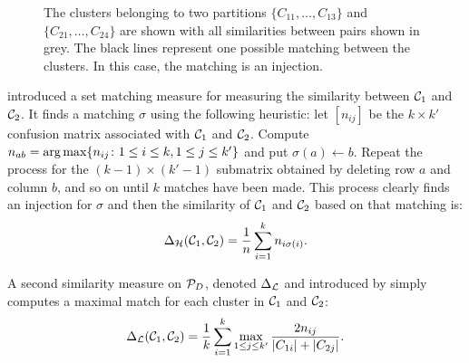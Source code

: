 \begin{figure}
  \centering
  \caption{The clusters belonging to two partitions $\{C_{11},\dotsc,C_{13}\}$
    and $\{C_{21},\dotsc,C_{24}\}$ are shown with all similarities between
    pairs shown in grey.  The black lines represent one possible matching
    between the clusters.  In this case, the matching is an injection.}
  \label{fig:matching}
\end{figure}

\citet{meila-2001} introduced a set matching measure for measuring the
similarity between $\mathcal{C}_1$ and $\mathcal{C}_2$.  It finds a matching $\sigma$
using the following heuristic: let $[n_{ij}]$ be the $k \times k'$ confusion
matrix associated with $\mathcal{C}_1$ and $\mathcal{C}_2$.  Compute $n_{ab} = \operatorname*{arg\,max}
\{n_{ij} \colon 1 \leq i \leq k, 1 \leq j \leq k'\}$ and put $\sigma(a) \gets
b$.  Repeat the process for the $(k-1) \times (k'-1)$ submatrix obtained by
deleting row $a$ and column $b$, and so on until $k$ matches have been made.
This process clearly finds an injection for $\sigma$ and then the similarity
of $\mathcal{C}_1$ and $\mathcal{C}_2$ based on that matching is:
\begin{equation*}
  \Delta_{\mathcal{H}}(\mathcal{C}_1,\mathcal{C}_2) = \frac{1}{n} \sum_{i=1}^{k} n_{i \sigma(i)}.
\end{equation*}

A second similarity measure on $\mathcal{P}_{D}$, denoted $\Delta_{\mathcal{L}}$
and introduced by \citet{larsen-aone-1999} simply computes a maximal match for
each cluster in $\mathcal{C}_1$ and $\mathcal{C}_2$:
\begin{equation*}
  \Delta_{\mathcal{L}}(\mathcal{C}_1,\mathcal{C}_2) = \frac{1}{k} \sum_{i=1}^{k} \max_{1 \leq j \leq k'}
                                             \frac{2n_{ij}}{|C_{1i}|+|C_{2j}|}.
\end{equation*}

